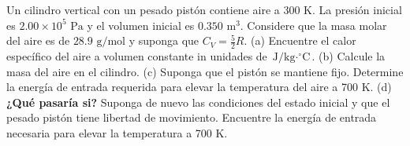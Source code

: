 \item Un cilindro vertical con un pesado pistón contiene aire a 300 K. La presión inicial es $2.00 \times 10^5\text{ Pa}$ y el volumen inicial es $0.350\text{ m}^3$. Considere que la masa molar del aire es de $28.9\text{ g/mol}$ y suponga que $C_V = \frac{5}{2}R$. (a) Encuentre el calor específico del aire a volumen constante in unidades de $\text{J/kg}\cdot^\circ\text{C}$. (b) Calcule la masa del aire en el cilindro. (c) Suponga que el pistón se mantiene fijo. Determine la energía de entrada requerida para elevar la temperatura del aire a 700 K. (d) \textbf{¿Qué pasaría si?} Suponga de nuevo las condiciones del estado inicial y que el pesado pistón tiene libertad de movimiento. Encuentre la energía de entrada necesaria para elevar la temperatura a 700 K.
